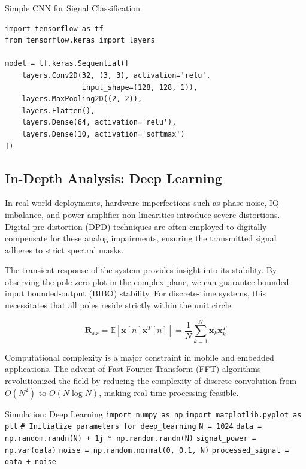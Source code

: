 \begin{pythonbox}{Simple CNN for Signal Classification}
\begin{verbatim}
import tensorflow as tf
from tensorflow.keras import layers

model = tf.keras.Sequential([
    layers.Conv2D(32, (3, 3), activation='relu', 
                  input_shape=(128, 128, 1)),
    layers.MaxPooling2D((2, 2)),
    layers.Flatten(),
    layers.Dense(64, activation='relu'),
    layers.Dense(10, activation='softmax')
])
\end{verbatim}
\end{pythonbox}

\subsection{In-Depth Analysis: Deep Learning}
In real-world deployments, hardware imperfections such as phase noise, IQ imbalance, and power amplifier non-linearities introduce severe distortions. Digital pre-distortion (DPD) techniques are often employed to digitally compensate for these analog impairments, ensuring the transmitted signal adheres to strict spectral masks.

The transient response of the system provides insight into its stability. By observing the pole-zero plot in the complex plane, we can guarantee bounded-input bounded-output (BIBO) stability. For discrete-time systems, this necessitates that all poles reside strictly within the unit circle.

\begin{equation}
    \mathbf{R}_{xx} = \mathbb{E}[\mathbf{x}[n]\mathbf{x}^T[n]] = \frac{1}{N} \sum_{k=1}^{N} \mathbf{x}_k \mathbf{x}_k^T
\end{equation}

Computational complexity is a major constraint in mobile and embedded applications. The advent of Fast Fourier Transform (FFT) algorithms revolutionized the field by reducing the complexity of discrete convolution from $O(N^2)$ to $O(N \log N)$, making real-time processing feasible.

\begin{pythonbox}{Simulation: Deep Learning}
\texttt{import numpy as np}
\texttt{import matplotlib.pyplot as plt}
\texttt{}
\texttt{\# Initialize parameters for deep\_learning}
\texttt{N = 1024}
\texttt{data = np.random.randn(N) + 1j * np.random.randn(N)}
\texttt{signal\_power = np.var(data)}
\texttt{noise = np.random.normal(0, 0.1, N)}
\texttt{processed\_signal = data + noise}
\end{pythonbox}

